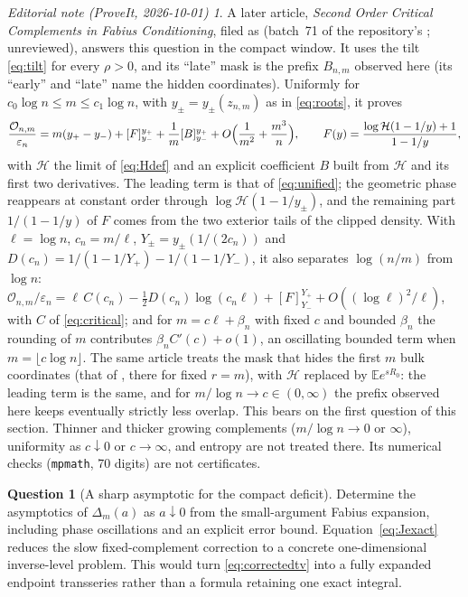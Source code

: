 \documentclass[11pt,a4paper]{article}
\numberwithin{equation}{section}
\theoremstyle{definition}
\newtheorem{question}{Question}
\theoremstyle{remark}
\newtheorem*{ednotelater}{Editorial note (ProveIt, 2026-10-01)}
\newcommand{\E}{\mathbb E}
\newcommand{\eps}{\varepsilon}
\newcommand{\ov}{\mathcal O}
\newcommand{\HH}{\mathcal H}
\begin{document}
\begin{ednotelater}
A later article, \emph{Second Order Critical Complements in Fabius
Conditioning}, filed as
(batch~71 of the repository's ; unreviewed), answers
this question in the compact window. It uses the tilt
\eqref{eq:tilt} for every $\rho>0$, and its ``late'' mask is the prefix
$B_{n,m}$ observed here (its ``early'' and ``late'' name the hidden
coordinates). Uniformly for $c_0\log n\le m\le c_1\log n$, with
$y_\pm=y_\pm(z_{n,m})$ as in \eqref{eq:roots}, it proves
\[
\frac{\ov_{n,m}}{\eps_n}=m(y_+-y_-)+[F]_{y_-}^{y_+}
 +\frac1m[B]_{y_-}^{y_+}+O\Bigl(\frac1{m^2}+\frac{m^3}{n}\Bigr),
\qquad F(y)=\frac{\log\HH(1-1/y)+1}{1-1/y},
\]
with $\HH$ the limit of \eqref{eq:Hdef} and an explicit coefficient $B$
built from $\HH$ and its first two derivatives. The leading term is that
of \eqref{eq:unified}; the geometric phase reappears at constant order
through $\log\HH(1-1/y_\pm)$, and the remaining part $1/(1-1/y)$ of $F$
comes from the two exterior tails of the clipped density. With
$\ell=\log n$, $c_n=m/\ell$, $Y_\pm=y_\pm(1/(2c_n))$ and
$D(c_n)=1/(1-1/Y_+)-1/(1-1/Y_-)$, it also separates $\log(n/m)$ from
$\log n$:
$\ov_{n,m}/\eps_n=\ell\,C(c_n)-\frac12D(c_n)\log(c_n\ell)
+[F]_{Y_-}^{Y_+}+O((\log\ell)^2/\ell)$, with $C$ of \eqref{eq:critical};
and for $m=c\ell+\beta_n$ with fixed $c$ and bounded $\beta_n$ the
rounding of $m$ contributes $\beta_nC'(c)+o(1)$, an oscillating bounded
term when $m=\lfloor c\log n\rfloor$. The same article treats the mask
that hides the first $m$ bulk coordinates (that of
, there for fixed
$r=m$), with $\HH$ replaced by $\E e^{sR_0}$: the leading term is the same,
and for $m/\log n\to c\in(0,\infty)$ the prefix observed here keeps
eventually strictly less overlap. This bears on the first question of
this section. Thinner and thicker growing complements
($m/\log n\to0$ or $\infty$), uniformity as $c\downarrow0$ or
$c\to\infty$, and entropy are not treated there. Its numerical checks (\texttt{mpmath}, 70 digits) are
not certificates.
\end{ednotelater}

\begin{question}[A sharp asymptotic for the compact deficit]
Determine the asymptotics of $\Delta_m(a)$ as $a\downarrow0$ from the
small-argument Fabius expansion, including phase oscillations and an
explicit error bound. Equation~\eqref{eq:Jexact} reduces the slow
fixed-complement correction to a concrete one-dimensional inverse-level
problem. This would turn \eqref{eq:correctedtv} into a fully expanded
endpoint transseries rather than a formula retaining one exact integral.
\end{question}
\end{document}
